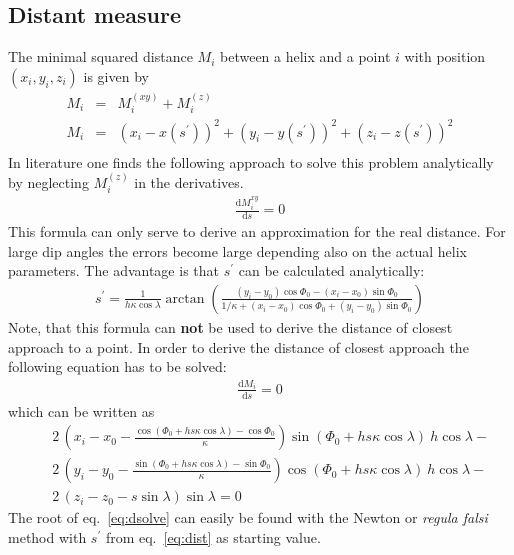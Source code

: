 \documentclass[twoside]{article}
\begin{document}
\subsection{Distant measure}
The minimal squared distance $M_i$ between a helix and a
point $i$ with position $(x_i, y_i, z_i)$ is given by
\begin{eqnarray}
     M_i & = & M_i^{(xy)} + M_i^{(z)} \\
     M_i & = & (x_i - x(s^\prime))^2 + (y_i - y(s^\prime))^2 + (z_i - z(s^\prime))^2 \\
\end{eqnarray}
In literature one finds the following approach to solve this problem analytically
by neglecting $M_i^{(z)}$ in the derivatives.
\begin{eqnarray}
\frac{\mathrm{d}M_i^{xy}}{\mathrm{d}s}  = 0
\end{eqnarray}
This formula can only serve to derive an approximation for the real distance.
For large dip angles the errors become large depending also on the actual helix
parameters. The advantage is that $s^\prime$ can be calculated analytically:
\begin{eqnarray}
  s^\prime = \frac{1}{h \kappa \cos\lambda} \arctan \left(
    \frac{(y_i-y_0)\cos\Phi_0 - (x_i-x_0) \sin\Phi_0}
    {1/\kappa + (x_i-x_0) \cos\Phi_0 + (y_i-y_0)\sin\Phi_0} \right) \label{eq:dist}
\end{eqnarray}
Note, that this formula can {\bf not} be used to derive the distance of closest
approach to a point.
In order to derive the distance of closest approach the following equation
has to be solved:
\begin{eqnarray}
\frac{\mathrm{d}M_i}{\mathrm{d}s}  = 0
\end{eqnarray}
which can be written as
\begin{eqnarray}
&&2\,\left (x_i-x_0-{\frac {\cos(\Phi_0+h s
  \kappa\cos\lambda)-\cos\Phi_0}{\kappa}}\right) 
  \sin(\Phi_0+h s \kappa\cos\lambda)\ h\cos\lambda -  \nonumber \\
&&2\,\left (y_i-y_0-{\frac {\sin(\Phi_0+h s \kappa\cos\lambda)-\sin
  \Phi_0}{\kappa}}\right) 
  \cos(\Phi_0+ h s \kappa\cos\lambda)\ h\cos\lambda- \nonumber \\
&&2\,\left(z_i-z_0-s\sin\lambda\right )\sin\lambda = 0   \label{eq:dsolve}
\end{eqnarray}
The root of eq.~\ref{eq:dsolve} can easily be found with the Newton or
{\it regula falsi} method
with $s^\prime$ from eq.~\ref{eq:dist} as starting value.
\end{document}
